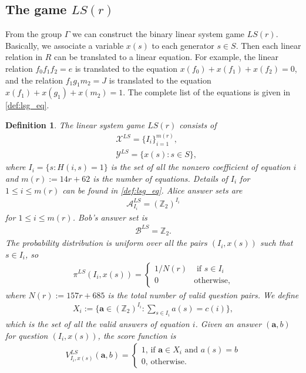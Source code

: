 \documentclass[11pt,letterpaper]{article}
\newcommand{\Z}{\mathbb{Z}}
\newcommand{\calX}{\mathcal{X}}
\newcommand{\calY}{\mathcal{Y}}
\newcommand{\calA}{\mathcal{A}}
\newcommand{\calB}{\mathcal{B}}
\newcommand{\1}{\mathbb{1}}
\newcommand{\LS}{LS}
\newcommand{\mr}{m(r)}
\newcommand{\ba}{\pmb{a}}
\newtheorem{definition}[theorem]{Definition}
\theoremstyle{definition}
\begin{document}
\subsection{The game $\LS(r)$}
\label{sec:lsr_def}
From the group $\Gamma$ we can construct the binary linear system game $\LS(r)$. Basically,
we associate a variable $x(s)$ to each generator $s \in S$.
Then each linear relation in $R$ can be translated to a linear equation.
For example, the linear relation $f_0f_1f_2 = e$ is translated 
to the equation $x(f_0) + x(f_1) + x(f_2) = 0$, and the relation 
$f_1g_1m_2 = J$ is translated to the equation
$x(f_1) + x(g_1) + x(m_2) = 1$. 
The complete list of the equations is given in \cref{def:lsg_eq}.
\begin{definition}
\label{def:lsg}
The linear system game $\LS(r)$ consists of
\begin{align*}
    & \calX^{\LS} = \{I_i\}_{i=1}^{\mr}, \\
    & \calY^{\LS} = \{ x(s) : s \in S \},
\end{align*}
where $I_i = \{ s : H(i,s) = 1\}$ is the set of all the nonzero coefficient of equation $i$
and $\mr := 14r + 62$ is the number of equations.  
Details of $I_i$ for $1 \leq i \leq \mr$ can be found in \cref{def:lsg_eq}.
Alice answer sets are 
\begin{align*}
    \calA^{\LS}_{I_i} = (\Z_2)^{I_i}
\end{align*}
for $1 \leq i \leq \mr$.
Bob's answer set is
\begin{align*}
    \calB^{\LS} = \Z_2.
\end{align*}
The probability distribution is uniform over all the pairs $(I_i, x(s))$ such that $s \in I_i$, so
\begin{align*}
    \pi^{\LS}(I_i, x(s)) = 
    \begin{cases}
        1/N(r) & \text{ if } s \in I_i \\
        0 & \text{otherwise,}
    \end{cases}
\end{align*}
where $N(r) := 157r + 685$ is the total number of valid question pairs.
We define 
\begin{align*}
    X_i := \{ \ba \in (\Z_2)^{I_i}: \sum_{s \in I_i} a(s) = c(i) \},
\end{align*}
which is the set of all the valid answers of equation $i$.
Given an answer $(\ba,b)$ for question $(I_i,x(s))$, 
the score function is
\begin{align*}
    V^{\LS}_{I_i, x(s)}(\ba, b) = 
    \begin{cases}
        1 \text{, if } \ba \in X_i \text{ and } a(s) = b\\
        0 \text{, otherwise}.
    \end{cases}
\end{align*}
\end{definition}
\end{document}

